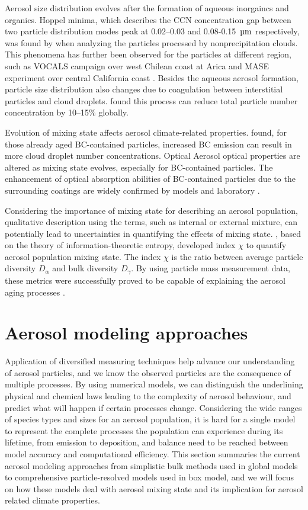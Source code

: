 \documentclass[edeposit,fullpage]{uiucthesis2009}
\begin{document}
Aerosol size distribution evolves after the formation of aqueous inorgaincs and organics. Hoppel minima, which describes the CCN concentration gap between two particle distribution modes peak at 0.02--0.03 and 0.08-0.15~$\rm \mu m$ respectively,  was found by \citet{hoppel1986effect} when analyzing the particles processed by nonprecipitation clouds. This phenomena has further been observed for the particles at different region, such as VOCALS campaign over west Chilean coast at Arica and MASE experiment over central California coast \citep{kleinman2012aerosol, hudson2015cloud}. Besides the aqueous aerosol formation, particle size distribution also changes due to coagulation between interstitial particles and cloud droplets. \citet{pierce2015importance} found this process can reduce total particle number concentration by 10--15\% globally. 

Evolution of mixing state affects aerosol climate-related properties. \citet{Ching2016} found, for those already aged BC-contained particles, increased BC emission can result in more cloud droplet number concentrations. Optical Aerosol optical properties are altered as mixing state evolves, especially for BC-contained particles. The enhancement of optical absorption abilities of BC-contained particles due to the surrounding coatings are widely confirmed by models and laboratory \citep{Moffet2009,Liu2017,wu2020light,Fierce2020}.

Considering the importance of mixing state for describing an aerosol population, qualitative description using the terms, such as internal or external mixture, can potentially lead to uncertainties in quantifying the effects of mixing state. \citet{Riemer2013a}, based on the theory of information-theoretic entropy, developed index $\chi$ to quantify aerosol population mixing state. The index $\chi$ is the ratio between average particle diversity $D_{\alpha}$ and bulk diversity $D_{\gamma}$. By using particle mass measurement data, these metrics were successfully proved to be capable of explaining the aerosol aging processes \citep{Healy2014}.  
\section{Aerosol modeling approaches}
Application of diversified measuring techniques help advance our understanding of aerosol particles, and we know the observed particles are the consequence of multiple processes. By using numerical models, we can distinguish the underlining physical and chemical laws leading to the complexity of aerosol behaviour, and predict what will happen if certain processes change. Considering the wide ranges of species types and sizes for an aerosol population, it is hard for a single model to represent the complete processes the population can experience during its lifetime, from emission to deposition, and balance need to be reached between model accuracy and computational efficiency. This section summaries the current aerosol modeling approaches from simplistic bulk methods used in global models to comprehensive particle-resolved models used in box model, and we will focus on how these models deal with aerosol mixing state and its implication for aerosol related climate properties. 
\end{document}
